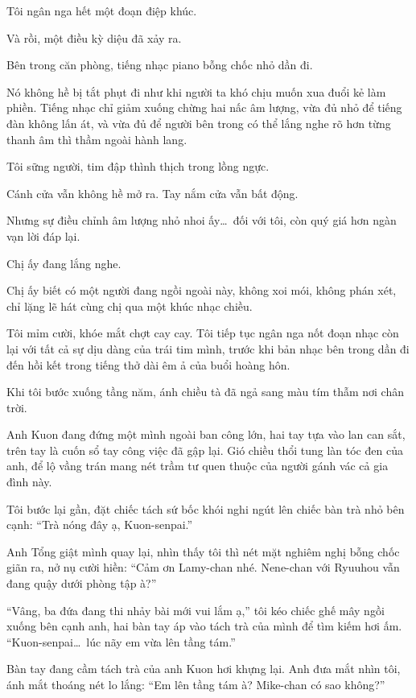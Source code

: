 \documentclass[../main.tex]{subfiles}
\begin{document}
Tôi ngân nga hết một đoạn điệp khúc.

Và rồi, một điều kỳ diệu đã xảy ra.

Bên trong căn phòng, tiếng nhạc piano bỗng chốc nhỏ dần đi.

Nó không hề bị tắt phụt đi như khi người ta khó chịu muốn xua đuổi kẻ làm phiền. Tiếng nhạc chỉ giảm xuống chừng hai nấc âm lượng, vừa đủ nhỏ để tiếng đàn không lấn át, và vừa đủ để người bên trong có thể lắng nghe rõ hơn từng thanh âm thì thầm ngoài hành lang.

Tôi sững người, tim đập thình thịch trong lồng ngực.

Cánh cửa vẫn không hề mở ra. Tay nắm cửa vẫn bất động.

Nhưng sự điều chỉnh âm lượng nhỏ nhoi ấy\dots\ đối với tôi, còn quý giá hơn ngàn vạn lời đáp lại.

Chị ấy đang lắng nghe.

Chị ấy biết có một người đang ngồi ngoài này, không xoi mói, không phán xét, chỉ lặng lẽ hát cùng chị qua một khúc nhạc chiều.

Tôi mỉm cười, khóe mắt chợt cay cay. Tôi tiếp tục ngân nga nốt đoạn nhạc còn lại với tất cả sự dịu dàng của trái tim mình, trước khi bản nhạc bên trong dần đi đến hồi kết trong tiếng thở dài êm ả của buổi hoàng hôn.

\ct

Khi tôi bước xuống tầng năm, ánh chiều tà đã ngả sang màu tím thẫm nơi chân trời.

Anh Kuon đang đứng một mình ngoài ban công lớn, hai tay tựa vào lan can sắt, trên tay là cuốn sổ tay công việc đã gập lại. Gió chiều thổi tung làn tóc đen của anh, để lộ vầng trán mang nét trầm tư quen thuộc của người gánh vác cả gia đình này.

Tôi bước lại gần, đặt chiếc tách sứ bốc khói nghi ngút lên chiếc bàn trà nhỏ bên cạnh: ``Trà nóng đây ạ, Kuon-senpai.''

Anh Tổng giật mình quay lại, nhìn thấy tôi thì nét mặt nghiêm nghị bỗng chốc giãn ra, nở nụ cười hiền: ``Cảm ơn Lamy-chan nhé. Nene-chan với Ryuuhou vẫn đang quậy dưới phòng tập à?''

``Vâng, ba đứa đang thi nhảy bài mới vui lắm ạ,'' tôi kéo chiếc ghế mây ngồi xuống bên cạnh anh, hai bàn tay áp vào tách trà của mình để tìm kiếm hơi ấm. ``Kuon-senpai\dots\ lúc nãy em vừa lên tầng tám.''

Bàn tay đang cầm tách trà của anh Kuon hơi khựng lại. Anh đưa mắt nhìn tôi, ánh mắt thoáng nét lo lắng: ``Em lên tầng tám à? Mike-chan có sao không?''
\end{document}
